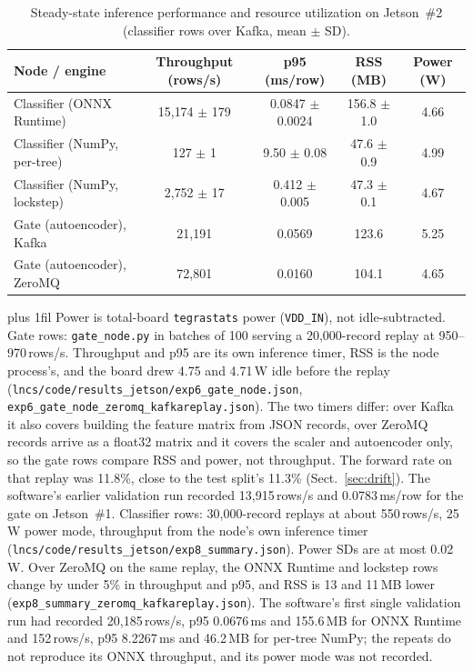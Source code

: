 \documentclass[runningheads]{llncs}
\newcommand{\tabnote}[1]{%
  \vspace{4pt}\par\noindent
  \begin{minipage}{\textwidth}%
    \footnotesize\parindent=0pt\leftskip=0pt\rightskip=0pt\parfillskip=0pt plus 1fil\relax
    #1%
  \end{minipage}}
\begin{document}
\begin{table}[htbp]
  \caption{Steady-state inference performance and resource utilization on Jetson~\#2 (classifier rows over Kafka, mean $\pm$ SD).}
  \label{tab:engines}
  \centering
  \small
  \begin{tabular}{l c c c c}
    \toprule
    Node / engine & Throughput (rows/s) & p95 (ms/row) & RSS (MB) & Power (W) \\
    \midrule
    Classifier (ONNX Runtime) & 15{,}174 $\pm$ 179 & 0.0847 $\pm$ 0.0024 & 156.8 $\pm$ 1.0 & 4.66 \\
    Classifier (NumPy, per-tree) & 127 $\pm$ 1 & 9.50 $\pm$ 0.08 & 47.6 $\pm$ 0.9 & 4.99 \\
    Classifier (NumPy, lockstep) & 2{,}752 $\pm$ 17 & 0.412 $\pm$ 0.005 & 47.3 $\pm$ 0.1 & 4.67 \\
    Gate (autoencoder), Kafka & 21{,}191 & 0.0569 & 123.6 & 5.25 \\
    Gate (autoencoder), ZeroMQ & 72{,}801 & 0.0160 & 104.1 & 4.65 \\
    \bottomrule
  \end{tabular}
  \tabnote{Power is total-board \texttt{tegrastats} power (\texttt{VDD\_IN}), not idle-subtracted. Gate rows: \texttt{gate\_node.py} in batches of 100 serving a 20{,}000-record replay at 950--970\,rows/s. Throughput and p95 are its own inference timer, RSS is the node process's, and the board drew 4.75 and 4.71\,W idle before the replay (\texttt{lncs/code/results\_jetson/exp6\_gate\_node.json}, \texttt{exp6\_gate\_node\_zeromq\_kafkareplay.json}). The two timers differ: over Kafka it also covers building the feature matrix from JSON records, over ZeroMQ records arrive as a float32 matrix and it covers the scaler and autoencoder only, so the gate rows compare RSS and power, not throughput. The forward rate on that replay was 11.8\%, close to the test split's 11.3\% (Sect.~\ref{sec:drift}). The software's earlier validation run recorded 13{,}915\,rows/s and 0.0783\,ms/row for the gate on Jetson~\#1. Classifier rows: 30{,}000-record replays at about 550\,rows/s, 25\,W power mode, throughput from the node's own inference timer (\texttt{lncs/code/results\_jetson/exp8\_summary.json}). Power SDs are at most 0.02\,W. Over ZeroMQ on the same replay, the ONNX Runtime and lockstep rows change by under 5\% in throughput and p95, and RSS is 13 and 11\,MB lower (\texttt{exp8\_summary\_zeromq\_kafkareplay.json}). The software's first single validation run had recorded 20{,}185\,rows/s, p95 0.0676\,ms and 155.6\,MB for ONNX Runtime and 152\,rows/s, p95 8.2267\,ms and 46.2\,MB for per-tree NumPy; the repeats do not reproduce its ONNX throughput, and its power mode was not recorded.}
\end{table}
\end{document}
